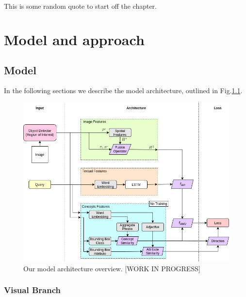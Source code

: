 \begin{savequote}[75mm]
This is some random quote to start off the chapter.
\end{savequote}

\chapter{Model and approach}
\label{ch:model}


\section{Model}

In the following sections we describe the model architecture, outlined
in Fig.\ref{fig:model-architecture}.

\begin{figure}
  \centering
  \includegraphics[width=1.0\textwidth]{figures/model-architecture.png}
  \caption[TODO]{Our model architecture overview. [WORK IN PROGRESS]}
  \label{fig:model-architecture}
\end{figure}

\subsection{Visual Branch}
\label{subsec:visual-branch}

